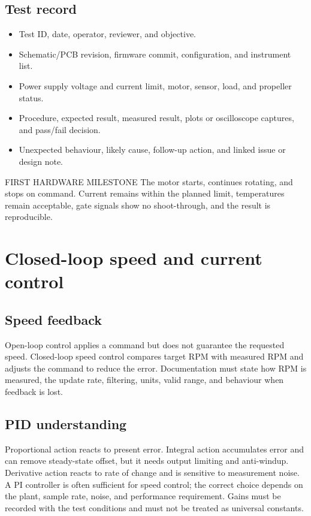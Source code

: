 \documentclass[11pt,a4paper]{article}
\begin{document}
\subsection{Test record}

\begin{itemize}
  \item Test ID, date, operator, reviewer, and objective.
  \item Schematic/PCB revision, firmware commit, configuration, and instrument list.
  \item Power supply voltage and current limit, motor, sensor, load, and propeller status.
  \item Procedure, expected result, measured result, plots or oscilloscope captures, and pass/fail decision.
  \item Unexpected behaviour, likely cause, follow-up action, and linked issue or design note.
\end{itemize}

\begin{warningbox}{FIRST HARDWARE MILESTONE}
  The motor starts, continues rotating, and stops on command. Current remains
  within the planned limit, temperatures remain acceptable, gate signals show
  no shoot-through, and the result is reproducible.
\end{warningbox}

\section{Closed-loop speed and current control}

\subsection{Speed feedback}

Open-loop control applies a command but does not guarantee the requested
speed. Closed-loop speed control compares target RPM with measured RPM and
adjusts the command to reduce the error. Documentation must state how RPM is
measured, the update rate, filtering, units, valid range, and behaviour when
feedback is lost.

\subsection{PID understanding}

Proportional action reacts to present error. Integral action accumulates error
and can remove steady-state offset, but it needs output limiting and
anti-windup. Derivative action reacts to rate of change and is sensitive to
measurement noise. A PI controller is often sufficient for speed control; the
correct choice depends on the plant, sample rate, noise, and performance
requirement. Gains must be recorded with the test conditions and must not be
treated as universal constants.
\end{document}
